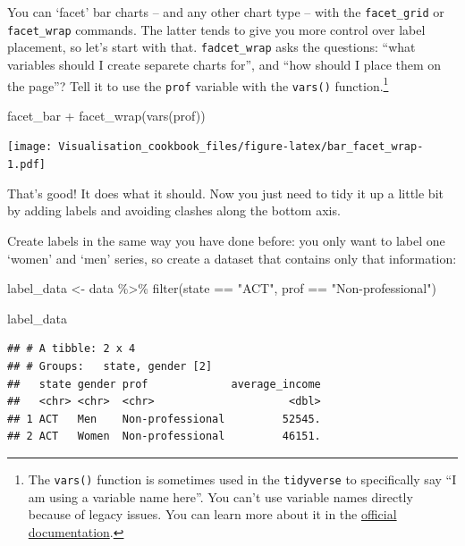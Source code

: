 \documentclass[
]{book}
\newenvironment{Shaded}{\begin{snugshade}}{\end{snugshade}}
\newcommand{\FunctionTok}[1]{\textcolor[rgb]{0.00,0.00,0.00}{#1}}
\newcommand{\NormalTok}[1]{#1}
\newcommand{\OtherTok}[1]{\textcolor[rgb]{0.56,0.35,0.01}{#1}}
\newcommand{\SpecialCharTok}[1]{\textcolor[rgb]{0.00,0.00,0.00}{#1}}
\newcommand{\StringTok}[1]{\textcolor[rgb]{0.31,0.60,0.02}{#1}}
\begin{document}
You can `facet' bar charts -- and any other chart type -- with the \texttt{facet\_grid} or \texttt{facet\_wrap} commands. The latter tends to give you more control over label placement, so let's start with that. \texttt{fadcet\_wrap} asks the questions: ``what variables should I create separete charts for'', and ``how should I place them on the page''? Tell it to use the \texttt{prof} variable with the \texttt{vars()} function.\footnote{The \texttt{vars()} function is sometimes used in the \texttt{tidyverse} to specifically say ``I am using a variable name here''. You can't use variable names directly because of legacy issues. You can learn more about it in the \href{https://ggplot2.tidyverse.org/reference/facet_wrap.html}{official documentation}.}

\begin{Shaded}
\begin{Highlighting}[]
\NormalTok{facet\_bar }\SpecialCharTok{+}
  \FunctionTok{facet\_wrap}\NormalTok{(}\FunctionTok{vars}\NormalTok{(prof))}
\end{Highlighting}
\end{Shaded}

\texttt{[image: Visualisation\_cookbook\_files/figure-latex/bar\_facet\_wrap-1.pdf]}

That's good! It does what it should. Now you just need to tidy it up a little bit by adding labels and avoiding clashes along the bottom axis.

Create labels in the same way you have done before: you only want to label one `women' and `men' series, so create a dataset that contains only that information:

\begin{Shaded}
\begin{Highlighting}[]
\NormalTok{label\_data }\OtherTok{\textless{}{-}}\NormalTok{ data }\SpecialCharTok{\%\textgreater{}\%} 
  \FunctionTok{filter}\NormalTok{(state }\SpecialCharTok{==} \StringTok{"ACT"}\NormalTok{,}
\NormalTok{         prof }\SpecialCharTok{==} \StringTok{"Non{-}professional"}\NormalTok{)}

\NormalTok{label\_data}
\end{Highlighting}
\end{Shaded}

\begin{verbatim}
## # A tibble: 2 x 4
## # Groups:   state, gender [2]
##   state gender prof             average_income
##   <chr> <chr>  <chr>                     <dbl>
## 1 ACT   Men    Non-professional         52545.
## 2 ACT   Women  Non-professional         46151.
\end{verbatim}
\end{document}

